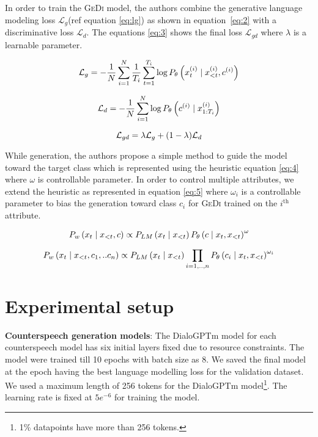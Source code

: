 In order to train the \textsc{GeDi} model, the authors combine the generative language modeling loss $\mathcal{L}_g$(ref equation \ref{eq:lg}) as shown in equation~\ref{eq:2} with a discriminative loss $\mathcal{L}_d$. The equations \ref{eq:3}  shows the final loss $\mathcal{L}_{gd}$ where $\lambda$ is a learnable parameter.

\begin{equation}
\scriptsize
    \label{eq:lg}
    \mathcal{L}_{g}=-\frac{1}{N} \sum_{i=1}^{N} \frac{1}{T_{i}} \sum_{t=1}^{T_{i}} \log P_{\theta}\left(x_{t}^{(i)} \mid x_{<t}^{(i)}, c^{(i)}\right)
\end{equation}

\begin{equation}
\scriptsize
    \label{eq:2}
    \mathcal{L}_{d}=-\frac{1}{N} \sum_{i=1}^{N} \log P_{\theta}\left(c^{(i)} \mid x_{1: T_{i}}^{(i)}\right)
\end{equation}

\begin{equation}
\scriptsize
    \label{eq:3}
    \mathcal{L}_{g d}=\lambda \mathcal{L}_{g}+(1-\lambda) \mathcal{L}_{d}
\end{equation}

While generation, the authors propose a simple method to guide the model toward the target class which is represented using the heuristic equation \ref{eq:4} where $\omega$ is controllable parameter. In order to control multiple attributes, we extend the heuristic as represented in equation \ref{eq:5} where $\omega_{i}$ is a controllable parameter to bias the generation toward class $c_{i}$ for \textsc{GeDi} trained on the $i^\textrm{th}$ attribute. 

\begin{equation}
    \scriptsize
    \label{eq:4}
    P_{w}\left(x_{t} \mid x_{<t}, c\right) \propto P_{L M}\left(x_{t} \mid x_{<t}\right) P_{\theta}\left(c \mid x_{t}, x_{<t}\right)^{\omega}
\end{equation}

\begin{equation}
    \label{eq:5}
    \scriptsize
    P_{w}\left(x_{t} \mid x_{<t}, c_{1}, .. c_{n}\right) \propto P_{L M}\left(x_{t} \mid x_{<t}\right)\prod_{i=1,..,n} P_{\theta}\left(c_{i} \mid x_{t}, x_{<t}\right)^{\omega_{i}}
\end{equation}

\section{Experimental setup}
\noindent\textbf{Counterspeech generation models}: The DialoGPTm model for each counterspeech model has six initial layers fixed due to resource constraints. The model were trained till 10 epochs with batch size as 8. We saved the final model at the epoch having the best language modelling loss for the validation dataset. We used a maximum length of 256 tokens for the DialoGPTm model\footnote{1\% datapoints have more than 256 tokens.}. The learning rate is fixed at $5e^{-6}$ for training the model.

